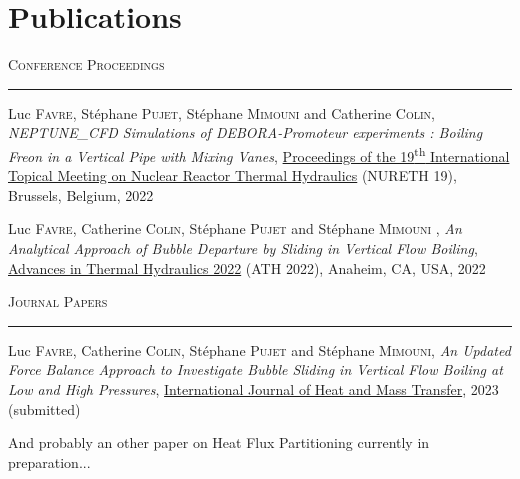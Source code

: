 

\chapter*{Publications} %

\npar
\npar


\textsc{Conference Proceedings}
\npar

\hrule

\npar
\npar

Luc \textsc{Favre}, Stéphane \textsc{Pujet}, Stéphane \textsc{Mimouni} and Catherine \textsc{Colin}, \textit{NEPTUNE\_CFD Simulations of DEBORA-Promoteur experiments : Boiling Freon in a Vertical Pipe with Mixing Vanes}, \ul{Proceedings of the 19\textsuperscript{th} International Topical Meeting on Nuclear Reactor Thermal Hydraulics} (NURETH 19), Brussels, Belgium, 2022

\npar
\npar

Luc \textsc{Favre}, Catherine \textsc{Colin}, Stéphane \textsc{Pujet} and Stéphane \textsc{Mimouni} , \textit{An Analytical Approach of Bubble Departure by Sliding in Vertical Flow Boiling}, \ul{Advances in Thermal Hydraulics 2022} (ATH 2022), Anaheim, CA, USA, 2022


\npar
\npar
\npar
\npar
\npar

\textsc{Journal Papers}
\npar

\hrule

\npar
\npar

Luc \textsc{Favre}, Catherine \textsc{Colin}, Stéphane \textsc{Pujet} and Stéphane \textsc{Mimouni}, \textit{An Updated Force Balance Approach to Investigate Bubble Sliding in Vertical Flow Boiling at Low and High Pressures}, \ul{International Journal of Heat and Mass Transfer}, 2023 (submitted)

\npar
\npar

And probably an other paper on Heat Flux Partitioning currently in preparation... {\Large{ \smiley{} }}